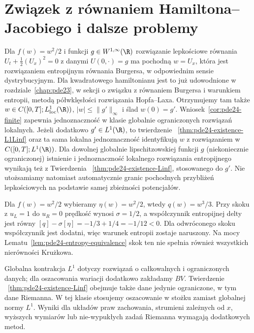\section{Związek z równaniem Hamiltona--Jacobiego i dalsze problemy}
Dla $f(w)=w^2/2$ i funkcji $g\in W^{1,\infty}(\R)$
rozwiązanie lepkościowe równania
$U_t+\tfrac12(U_x)^2=0$ z danymi $U(0,\cdot)=g$
ma pochodną
$w=U_x$, która jest rozwiązaniem entropijnym
równania Burgersa, w odpowiednim sensie dystrybucyjnym.
Dla kwadratowego hamiltonianu jest to już udowodnione
w rozdziale~\ref{chap:pde23}, w sekcji o związku
z równaniem Burgersa i warunkiem entropii, metodą
półwklęsłości rozwiązania Hopfa--Laxa. Otrzymujemy
tam także $w\in C([0,T];L^1_{\mathrm{loc}}(\R))$,
$|w|\le\|g'\|_\infty$ i ślad $w(0)=g'$.
Wniosek~\ref{cor:pde24-finite} zapewnia jednoznaczność
w klasie globalnie ograniczonych rozwiązań lokalnych.
Jeżeli dodatkowo $g'\in L^1(\R)$, to twierdzenie
~\ref{thm:pde24-existence-L1Linf} oraz ta sama lokalna
jednoznaczność identyfikują $w$ z rozwiązaniem
w $C([0,T];L^1(\R))$. Dla dowolnej globalnie
lipschitzowskiej funkcji $g$ (niekoniecznie ograniczonej)
istnienie i jednoznaczność lokalnego rozwiązania
entropijnego wynikają też z Twierdzenia
~\ref{thm:pde24-existence-Linf}, stosowanego do $g'$.
Nie utożsamiamy natomiast
automatycznie granic pochodnych przybliżeń
lepkościowych na podstawie samej zbieżności potencjałów.

\begin{przyklad}
Dla $f(w)=w^2/2$ wybieramy $\eta(w)=w^2/2$, wtedy
$q(w)=w^3/3$. Przy skoku z $u_L=1$ do $u_R=0$
prędkość wynosi $\sigma=1/2$, a współczynnik
entropijnej delty jest równy
$[q]-\sigma[\eta]=-1/3+1/4=-1/12<0$.
Dla odwróconego skoku współczynnik jest dodatni,
więc warunek entropii zostaje naruszony. Na mocy
Lematu~\ref{lem:pde24-entropy-equivalence} skok ten
nie spełnia również wszystkich nierówności Krużkowa.
\end{przyklad}

\begin{uwaga}
Globalna kontrakcja $L^1$ dotyczy rozwiązań
o całkowalnych i ograniczonych danych; dla oszacowania
wariacji dodatkowo zakładamy $BV$. Twierdzenie
~\ref{thm:pde24-existence-Linf} obejmuje także dane
jedynie ograniczone, w tym dane Riemanna. W tej klasie
stosujemy oszacowanie w stożku zamiast globalnej normy
$L^1$. Wyniki dla układów praw zachowania,
strumieni zależnych od $x$, wyższych wymiarów lub
nie-wypukłych zadań Riemanna wymagają dodatkowych metod.
\end{uwaga}



